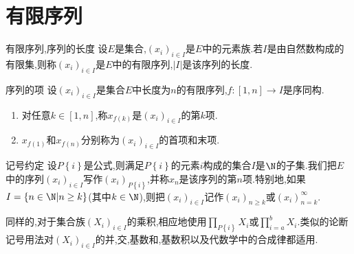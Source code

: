 \section{有限序列}

\begin{definition}{有限序列,序列的长度}{}
	设$E$是集合,$\left(x_{i}\right)_{i\in I}$是$E$中的元素族.若$I$是由自然数构成的有限集,则称$\left(x_{i}\right)_{i\in I}$是$E$中的有限序列,$\left|I\right|$是该序列的长度.
\end{definition}

\begin{definition}{序列的项}{}
	设$\left(x_{i}\right)_{i\in I}$是集合$E$中长度为$n$的有限序列,$f:\left[1,n\right]\to I$是序同构.
	\begin{enumerate}
		\item 对任意$k\in\left[1,n\right]$,称$x_{f\left(k\right)}$是$\left(x_{i}\right)_{i\in I}$的第$k$项.
		\item $x_{f\left(1\right)}$和$x_{f\left(n\right)}$分别称为$\left(x_{i}\right)_{i\in I}$的首项和末项.
	\end{enumerate}
\end{definition}

\begin{remark}{记号约定}{}
	设$P\left\{i\right\}$是公式,则满足$P\left\{i\right\}$的元素$i$构成的集合$I$是$\N$的子集.我们把$E$中的序列$\left(x_{i}\right)_{i\in I}$写作$\left(x_{i}\right)_{P\left\{i\right\}}$,并称$x_{n}$是该序列的第$n$项.特别地,如果$I=\left\{n\in\N\middle|n\geq k\right\}$(其中$k\in\N$),则把$\left(x_{i}\right)_{i\in I}$记作$\left(x_{i}\right)_{n\geq k}$或$\left(x_{i}\right)_{n=k}^{\infty}$.
	
	同样的,对于集合族$\left(X_{i}\right)_{i\in I}$的乘积,相应地使用$\prod\limits_{P\left\{i\right\}}X_{i}$或$\prod\limits_{i=a}^{b}X_{i}$.类似的论断记号用法对$\left(X_{i}\right)_{i\in I}$的并,交,基数和,基数积以及代数学中的合成律都适用.
\end{remark}
























